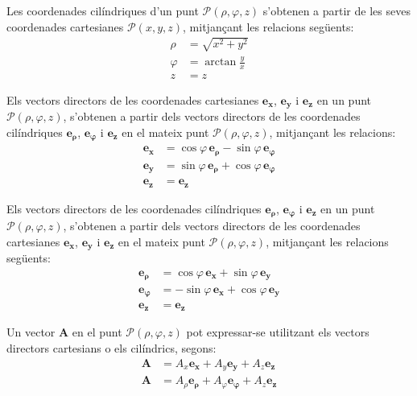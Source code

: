 \documentclass[catalan,a4paper,twoside,11pt]{article}
\begin{document}
Les coordenades  cilíndriques  d'un punt $\mathscr{P}(\rho,\varphi,z)$
s'obtenen a partir de les seves coordenades cartesianes $\mathscr{P}(x,y,z)$,
mitjançant les relacions següents:
\begin{subequations}\begin{align}
    \rho &= \sqrt{x^2+y^2}\\
    \varphi &=  \arctan\frac{y}{x}\\
    z &= z
\end{align}\end{subequations}

Els vectors directors de les coordenades cartesianes  $\boldsymbol{e_x}$, $\boldsymbol{e_y}$ i $\boldsymbol{e_z}$ en un punt $\mathscr{P}(\rho,\varphi,z)$,  s'obtenen a partir dels vectors directors de les coordenades cilíndriques $\boldsymbol{e_\rho}$, $\boldsymbol{e_\varphi}$ i $\boldsymbol{e_z}$ en el mateix punt $\mathscr{P}(\rho,\varphi,z)$, mitjançant les relacions:
\begin{subequations}\begin{align}
		\boldsymbol{e_x} &=\cos\varphi\,\boldsymbol{e_\rho}-\sin\varphi\,\boldsymbol{e_\varphi} \\
		\boldsymbol{e_y} &=\sin\varphi\,\boldsymbol{e_\rho}+\cos\varphi\,\boldsymbol{e_\varphi} \\
		\boldsymbol{e_z} &=\boldsymbol{e_z}
\end{align}\end{subequations}

Els vectors directors de les coordenades cilíndriques  $\boldsymbol{e_\rho}$, $\boldsymbol{e_\varphi}$ i $\boldsymbol{e_z}$ en un punt $\mathscr{P}(\rho,\varphi,z)$, s'obtenen a partir dels vectors directors de les coordenades cartesianes $\boldsymbol{e_x}$, $\boldsymbol{e_y}$ i $\boldsymbol{e_z}$ en el mateix punt $\mathscr{P}(\rho,\varphi,z)$, mitjançant les relacions següents:
\begin{subequations}\begin{align}
    \boldsymbol{e_\rho} &=\cos\varphi\,\boldsymbol{e_x}+\sin\varphi\,\boldsymbol{e_y} \\
    \boldsymbol{e_\varphi} &=-\sin\varphi\,\boldsymbol{e_x}+\cos\varphi\,\boldsymbol{e_y} \\
    \boldsymbol{e_z} &=\boldsymbol{e_z}
\end{align}\end{subequations}


Un vector $\boldsymbol{A}$ en el punt $\mathscr{P}(\rho, \varphi, z)$  pot expressar-se utilitzant els vectors directors cartesians o els cilíndrics, segons:
\begin{subequations}\begin{align}
		\boldsymbol{A} &= A_x \boldsymbol{e_x} + A_y \boldsymbol{e_y} + A_z \boldsymbol{e_z} \\
		\boldsymbol{A} &= A_\rho  \boldsymbol{e_\rho} + A_\varphi \boldsymbol{e_\varphi} + A_z \boldsymbol{e_z}
\end{align}\end{subequations}
\end{document}
